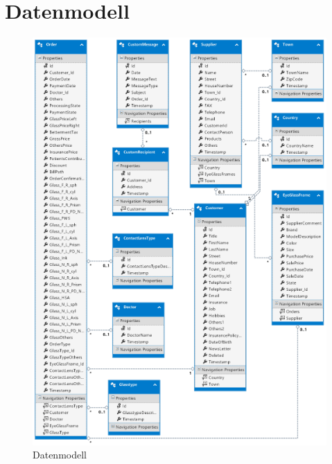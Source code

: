 \section{Datenmodell}
\begin{figure}
\begin{center}
	\includegraphics[scale=1.05]{images/db.png}
\end{center}
	\caption{Datenmodell}
	\label{fig:sample}
\end{figure}
